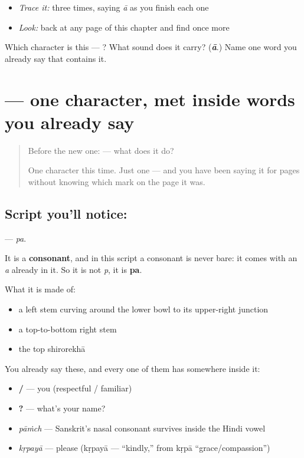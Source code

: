 \begin{itemize}
\raggedright
  \item \emph{Trace it:}  three times, saying \emph{ā} as you finish each one
  \item \emph{Look:} back at any page of this chapter and find  once more
\end{itemize}

\begin{tcolorbox}[breakable,colback=teal!4,colframe=teal!35!black,title={Before you move on}]
Which character is this — ? What sound does it carry? (\emph{\textbf{ā}}.) Name one word you already say that contains it.
\end{tcolorbox}
\section[\texorpdfstring{\hi{प} (pa)}{प (pa)}]{ — one character, met inside words you already say}

\label{lesson:HI-S113-letter-pa}



\begin{quote}
Before the new one:  — what does it do?

One character this time. Just one — and you have been saying it for pages without knowing which mark on the page it was.
\end{quote}

\subsection*{Script you'll notice: }
\textbf{} — \emph{pa}.

It is a \textbf{consonant}, and in this script a consonant is never bare: it comes with an \emph{a} already in it. So it is not \emph{p}, it is \textbf{pa}.

What it is made of:

\begin{itemize}
\raggedright
  \item a left stem curving around the lower bowl to its upper-right junction
  \item a top-to-bottom right stem
  \item the top shirorekhā
\end{itemize}

You already say these, and every one of them has  somewhere inside it:

\begin{itemize}
\raggedright
  \item \textbf{ / } — you (respectful / familiar)
  \item \textbf{   ?} — what's your name?
  \item \textbf{} \emph{pāṁch} — Sanskrit's nasal consonant survives inside the Hindi vowel
  \item \textbf{} \emph{kṛpayā} — please (kṛpayā — \textquotedblleft{}kindly,\textquotedblright{} from kṛpā \textquotedblleft{}grace/compassion\textquotedblright{})
\end{itemize}

